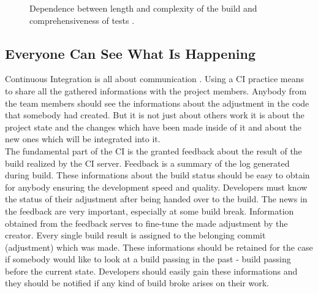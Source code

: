 \begin{figure}[H]
    \centering
    \caption{Dependence between length and complexity of the build and comprehensiveness of tests \cite{deployment_automation}.}
    \label{fig:grap_dependence}
\end{figure}

\subsection{Everyone Can See What Is Happening}

Continuous Integration is all about communication \cite{MartinFowler}. Using a CI practice means to share all the gathered informations with the project members. Anybody from the team members should see the informations about the adjustment in the code that somebody had created. But it is not just about others work it is about the project state and the changes which have been made inside of it and about the new ones which will be integrated into it.\\

The fundamental part of the CI is the granted feedback about the result of the build realized by the CI server. Feedback is a summary of the log generated during build. These informations about the build status should be easy to obtain for anybody ensuring the development speed and quality. Developers must know the status of their adjustment after being handed over to the build. The news in the feedback are very important, especially at some build break. Information obtained from the feedback serves to fine-tune the made adjustment by the creator. Every single build result is assigned to the belonging commit (adjustment) which was made. These informations should be retained for the case if somebody would like to look at a build passing in the past - build passing before the current state. Developers should easily gain these informations and they should be notified if any kind of build broke arises on their work.

